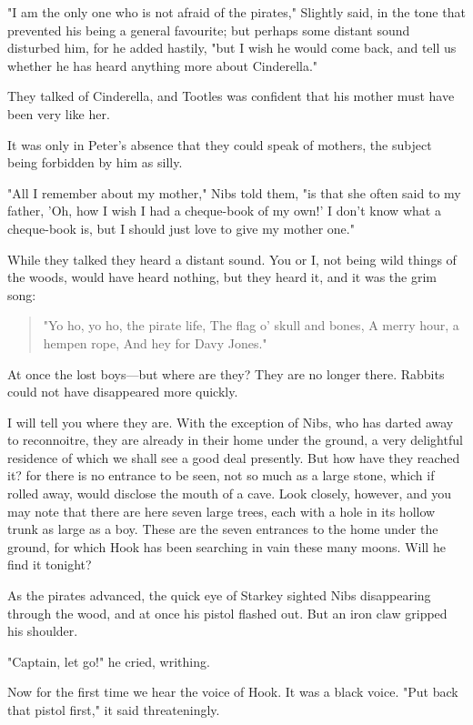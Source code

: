 "I am the only one who is not afraid of the pirates," Slightly said, in
the tone that prevented his being a general favourite; but perhaps some
distant sound disturbed him, for he added hastily, "but I wish he would
come back, and tell us whether he has heard anything more about
Cinderella."


They talked of Cinderella, and Tootles was confident that his mother must
have been very like her.


It was only in Peter's absence that they could speak of mothers, the
subject being forbidden by him as silly.


"All I remember about my mother," Nibs told them, "is that she often said
to my father, 'Oh, how I wish I had a cheque-book of my own!' I don't know
what a cheque-book is, but I should just love to give my mother one."


While they talked they heard a distant sound. You or I, not being wild
things of the woods, would have heard nothing, but they heard it, and it
was the grim song:

\begin{verse}
     "Yo ho, yo ho, the pirate life,
     The flag o' skull and bones,
     A merry hour, a hempen rope,
     And hey for Davy Jones."
\end{verse}

At once the lost boys—but where are they? They are no longer there.
Rabbits could not have disappeared more quickly.


I will tell you where they are. With the exception of Nibs, who has darted
away to reconnoitre, they are already in their home under
the ground, a very delightful residence of which we shall see a good deal
presently. But how have they reached it? for there is no entrance to be
seen, not so much as a large stone, which if rolled away, would disclose
the mouth of a cave. Look closely, however, and you may note that there
are here seven large trees, each with a hole in its hollow trunk as large
as a boy. These are the seven entrances to the home under the ground, for
which Hook has been searching in vain these many moons. Will he find it
tonight?


As the pirates advanced, the quick eye of Starkey sighted Nibs
disappearing through the wood, and at once his pistol flashed out. But an
iron claw gripped his shoulder.


"Captain, let go!" he cried, writhing.


Now for the first time we hear the voice of Hook. It was a black voice.
"Put back that pistol first," it said threateningly.


